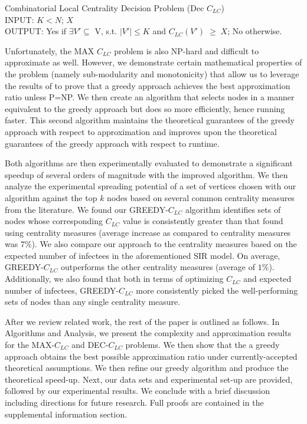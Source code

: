 \begin{define} Combinatorial Local Centrality Decision Problem (Dec $C_{LC}$) \\
INPUT: $K < N$; $X$\\
OUTPUT: Yes if  $\exists V' \subseteq$ V, s.t. $|V'| \leq K$ and  $C_{LC}(V') \; \geq \; X$; No otherwise. \end{define}


Unfortunately, the MAX $C_{LC}$ problem is also NP-hard and difficult to approximate as well.  However, we demonstrate certain mathematical properties of the problem (namely sub-modularity and monotonicity) that allow us to leverage the results of \cite{nemhauser78} to prove that a greedy approach achieves the best approximation ratio unless P=NP.  We then create an algorithm that selects nodes in a manner equivalent to the greedy approach but does so more efficiently, hence running faster.  This second algorithm maintains the theoretical guarantees of the greedy approach with respect to approximation and improves upon the theoretical guarantees of the greedy approach with respect to runtime.

Both algorithms are then experimentally evaluated to demonstrate a significant speedup of several orders of magnitude with the improved algorithm.  We then analyze the experimental spreading potential of a set of vertices chosen with our algorithm against the top $k$ nodes based on several common centrality measures from the literature.  We found our GREEDY-$C_{LC}$ algorithm identifies sets of nodes whose corresponding $C_{LC}$ value is consistently greater than that found using centrality measures (average increase as compared to centrality measures was $7\%$).  We also compare our approach to the centrality measures based on the expected number of infectees in the aforementioned SIR model.  On average, GREEDY-$C_{LC}$ outperforms the other centrality measures (average of $1\%$).  Additionally, we also found that both in terms of optimizing $C_{LC}$ and expected number of infectees, GREEDY-$C_{LC}$ more consistently picked the well-performing sets of nodes than any single centrality measure.

After we review related work, the rest of the paper is outlined as follows.  In Algorithms and Analysis, we present the complexity and approximation results for the MAX-$C_{LC}$ and DEC-$C_{LC}$ problems.  We then show that the a greedy approach obtains the best possible approximation ratio under currently-accepted theoretical assumptions.  We then refine our greedy algorithm and produce the theoretical speed-up.  Next, our data sets and experimental set-up are provided, followed by our experimental results. We conclude with a brief discussion including directions for future research.  Full proofs are contained in the supplemental information section.


